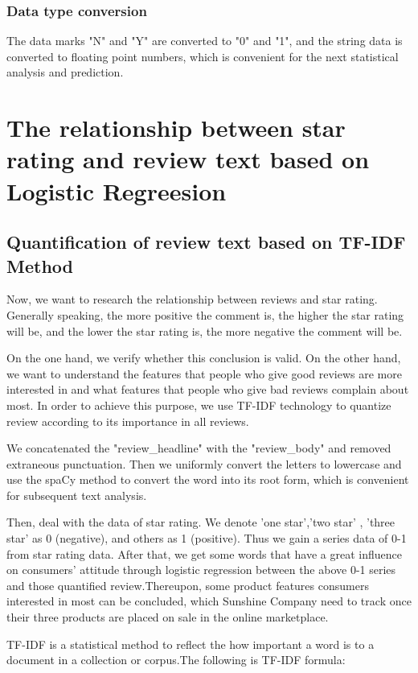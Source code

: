 \documentclass{mcmthesis}
\begin{document}
\subsubsection{Data type conversion}

The data marks "N" and "Y" are converted to "0" and "1", and the string data is converted to floating point numbers, which is convenient for the next statistical analysis and prediction.

\section{The relationship between star rating and review text based
on Logistic Regreesion}

\subsection{Quantification of review text based on TF-IDF Method}
Now, we want to research the relationship between reviews and star rating. Generally
speaking, the more positive the comment is, the higher the star rating will be, and the lower
the star rating is, the more negative the comment will be. 

On the one hand, we verify whether
this conclusion is valid. On the other hand, we want to understand the features that people
who give good reviews are more interested in and what features that people who give bad
reviews complain about most. In order to achieve this purpose, we use TF-IDF technology
to quantize review according to its importance in all reviews.

We concatenated the "review\_headline" with the "review\_body" and removed extraneous punctuation. Then we uniformly convert the letters to lowercase and use the spaCy method to convert the word into its root form, which is convenient for subsequent text analysis.

Then, deal with the data of
star rating. We denote ’one star’,’two star’ , ’three star’ as 0 (negative), and others as 1 (positive). Thus we gain
a series data of 0-1 from star rating data. After that, we get some words that have a great
influence on consumers’ attitude through logistic regression between the above 0-1 series and
those quantified review.Thereupon, some product features consumers interested in most can
be concluded, which Sunshine Company need to track once their three products are placed on
sale in the online marketplace.

TF-IDF is a statistical method to reflect the how important a word is to a document in a
collection or corpus.The following is TF-IDF formula:
\end{document}

